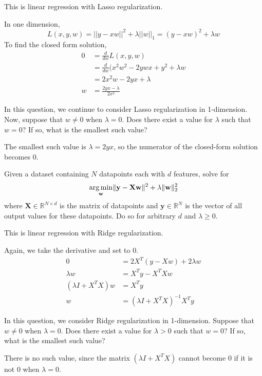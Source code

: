 This is linear regression with Lasso regularization.

\begin{subsolution}
  In one dimension,
  \[
    L(x, y, w) = ||y - xw||^2 + \lambda ||w||_1 = (y-xw)^2 + \lambda w
  \]
  To find the closed form solution,
  \begin{align*}
    0 &= \frac{d}{dw} L(x,y,w)\\
    &= \frac{d}{dw} (x^2 w^2 - 2ywx + y^2 + \lambda w\\
    &= 2 x^2 w - 2yx + \lambda\\
    w &= \frac{2yx - \lambda}{2 x^2}
  \end{align*}
\end{subsolution}

\subproblem
In this question, we continue to consider Lasso regularization in 1-dimension. Now, suppose that $w \neq 0$ when $\lambda = 0$. Does there exist a value for $\lambda$ such that $w = 0$? If so, what is the smallest such value?

\begin{subsolution}
  The smallest such value is $\lambda = 2yx$, so the numerator of the closed-form solution becomes 0.
\end{subsolution}

\problem[9]
\subproblem
Given a dataset containing $N$ datapoints each with $d$ features, solve for
\[\underset{\mathbf{w}}{\operatorname{arg\,min}} \Vert\mathbf{y} - \mathbf{X}\mathbf{w}\Vert^2 + \lambda\Vert\mathbf{w}\Vert_2^2
\]
where $\mathbf{X} \in \mathbb{R}^{N \times d}$ is the matrix of datapoints and $\mathbf{y} \in \mathbb{R}^N$ is the  vector of all output values for these datapoints. Do so for arbitrary $d$ and $\lambda \geq 0$.

This is linear regression with Ridge regularization.

\begin{subsolution}
  Again, we take the derivative and set to 0.
  \begin{align*}
    0 &= 2 X^T (y - X w) + 2 \lambda w\\
    \lambda w &= X^T y - X^T X w\\
    (\lambda I + X^T X) w &= X^T y\\
    w &= (\lambda I + X^T X)^{-1} X^T y
  \end{align*}
\end{subsolution}

\subproblem In this question, we consider Ridge regularization in 1-dimension. Suppose that $w \neq 0$ when $\lambda = 0$. Does there exist a value for $\lambda > 0$ such that $w = 0$? If so, what is the smallest such value?

\begin{subsolution}
  There is no such value, since the matrix $(\lambda I + X^T X)$ cannot become 0 if it is not 0 when $\lambda = 0$.
\end{subsolution}



